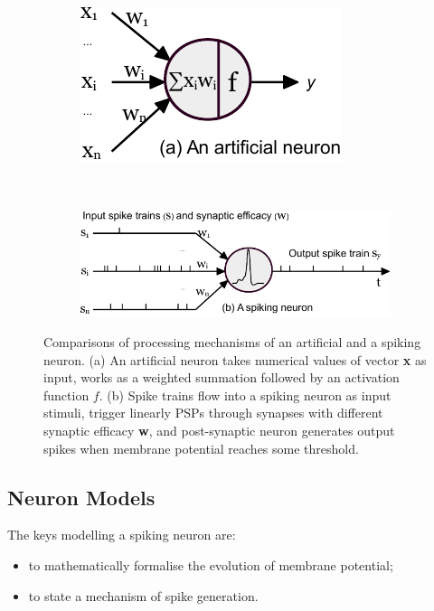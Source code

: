 	\begin{figure}[tb!]
		\centering
		\begin{subfigure}[t]{0.28\textwidth}
			\includegraphics[width=\textwidth]{pics_snn/neuron_ann.pdf}
		\end{subfigure}~
		\begin{subfigure}[t]{0.65\textwidth}
			\includegraphics[width=\textwidth]{pics_snn/neuron_snn.pdf}
		\end{subfigure}
		\caption{Comparisons of processing mechanisms of an artificial and a spiking neuron. (a) An artificial neuron takes numerical values of vector \textbf{x} as input, works as a weighted summation followed by an activation function $f$. (b) Spike trains flow into a spiking neuron as input stimuli, trigger linearly \DIFdelbeginFL {}\DIFdelendFL \DIFaddbeginFL {}\DIFaddendFL PSPs through synapses with different synaptic efficacy \textbf{w}, and \DIFaddbeginFL {}\DIFaddendFL post-synaptic neuron generates output spikes when \DIFaddbeginFL {}\DIFaddendFL membrane potential reaches some threshold.}
		\label{Fig:compare_as}
	\end{figure}

\subsection{Neuron Models}
\label{subsec:neuron_model}
The keys \DIFdelbegin {}\DIFdelend \DIFaddbegin {}\DIFaddend modelling a spiking neuron are: 
\begin{itemize}
	\item to mathematically formalise the evolution of \DIFaddbegin {}\DIFaddend membrane potential;
	\item to state a mechanism of spike generation.
\end{itemize}

